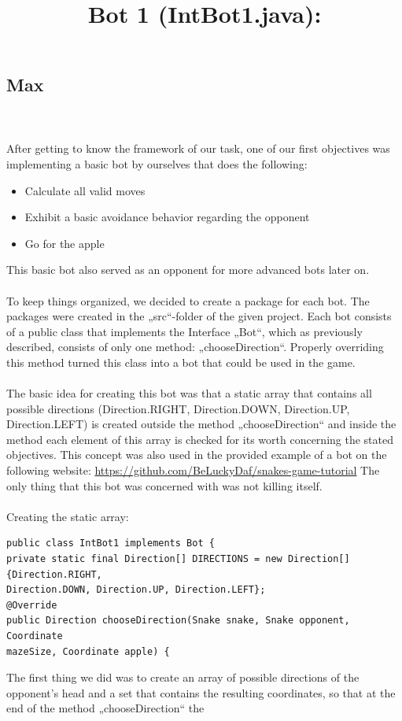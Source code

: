 \documentclass[a4paper,12pt]{article}
\begin{document}
\subsection{Max}
\title{Bot 1 (IntBot1.java):}\\
\\
After getting to know the framework of our task, one of our first objectives was implementing a
basic bot by ourselves that does the following:\\
\begin{itemize}
\item Calculate all valid moves
\item Exhibit a basic avoidance behavior regarding the opponent
\item Go for the apple
\end{itemize}
This basic bot also served as an opponent for more advanced bots later on.\\
\\
To keep things organized, we decided to create a package for each bot. The packages were created
in the „src“-folder of the given project. Each bot consists of a public class that implements the
Interface „Bot“, which as previously described, consists of only one method: „chooseDirection“.
Properly overriding this method turned this class into a bot that could be used in the game.
\\
\\
The basic idea for creating this bot was that a static array that contains all possible directions
(Direction.RIGHT, Direction.DOWN, Direction.UP, Direction.LEFT) is created outside the method
„chooseDirection“ and inside the method each element of this array is checked for its worth
concerning the stated objectives. This concept was also used in the provided example of  a bot  on the following website: \url{https://github.com/BeLuckyDaf/snakes-game-tutorial} The only thing that this bot was concerned with was not killing itself.\\
\\
Creating the static array:
\begin{verbatim}
public class IntBot1 implements Bot {
private static final Direction[] DIRECTIONS = new Direction[]{Direction.RIGHT,
Direction.DOWN, Direction.UP, Direction.LEFT};
@Override
public Direction chooseDirection(Snake snake, Snake opponent, Coordinate
mazeSize, Coordinate apple) {
\end{verbatim}
The first thing we did was to create an array of possible directions of the opponent’s head and a set
that contains the resulting coordinates, so that at the end of the method „chooseDirection“ the
\end{document}
